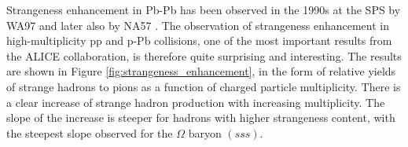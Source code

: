     Strangeness enhancement in Pb-Pb has been observed in the 1990s at the SPS by WA97\cite{WA97StrangenessEnhancement} and later also by NA57 \cite{NA57StrangenessEnhancement}.
    The observation of strangeness enhancement in high-multiplicity pp and p-Pb collisions,\cite{StrangenessEnhancement} one of the most important results from the ALICE collaboration, is therefore quite surprising and interesting. The results are shown in Figure \ref{fig:strangeness_enhancement}, in the form of relative yields of strange hadrons to pions as a function of charged particle multiplicity. There is a clear increase of strange hadron production with increasing multiplicity. The slope of the increase is steeper for hadrons with higher strangeness content, with the steepest slope observed for the $\Omega$ baryon $(sss)$. 

